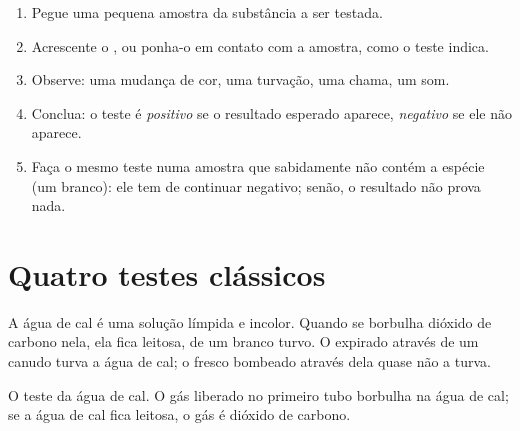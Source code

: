 \begin{method}\label{met:g7:identifying-substances:run}
\begin{enumerate}
  \item Pegue uma pequena amostra da substância a ser testada.
  \item Acrescente o , ou ponha-o em contato com a amostra, como
        o teste indica.
  \item Observe: uma mudança de cor, uma turvação, uma chama, um som.
  \item Conclua: o teste é \emph{positivo} se o resultado esperado
        aparece, \emph{negativo} se ele não aparece.
  \item Faça o mesmo teste numa amostra que sabidamente não contém a
        espécie (um branco): ele tem de continuar negativo; senão, o
        resultado não prova nada.
\end{enumerate}
\end{method}

\section{Quatro testes clássicos}

\begin{proposition}\label{prop:g7:identifying-substances:limewater}
A água de cal é uma solução límpida e incolor. Quando se borbulha
dióxido de carbono nela, ela fica leitosa, de um branco turvo. O 
expirado através de um canudo turva a água de cal; o  fresco bombeado
através dela quase não a turva.
\end{proposition}

\begin{omfigure}

{\small O teste da água de cal. O gás liberado no primeiro tubo borbulha
na água de cal; se a água de cal fica leitosa, o gás é dióxido de
carbono.}
\end{omfigure}

